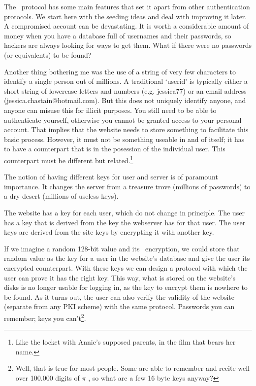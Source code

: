 The \TIMO\ protocol has some main features that set it apart from other authentication protocols.
We start here with the seeding ideas and deal with improving it later.
A compromised account can be devastating.
It is worth a considerable amount of money when you have a database full of usernames and their passwords, so hackers are always looking for ways to get them.
What if there were no passwords (or equivalents) to be found?
\par
Another thing bothering me was the use of a string of very few characters to identify a single person out of millions.
A traditional `userid' is typically either a short string of lowercase letters and numbers
(e.g. jessica77)
or an email address
(jessica.chastain@hotmail.com).
But this does not uniquely identify anyone, and anyone can misuse this for illicit purposes.
You still need to be able to authenticate yourself, otherwise you cannot be granted access to your personal account.
That implies that the website needs to store something to facilitate this basic process.
However, it must not be something useable in and of itself; it has to have a counterpart that is in the posession of the individual user.
This counterpart must be different but related.\footnote{Like the locket with Annie's supposed parents, in the film that bears her name.}
\par
The notion of having different keys for user and server is of paramount importance.
It changes the server from a treasure trove (millions of passwords) to a dry desert (millions of useless keys).
\par
The website has a key for each user, which do not change in principle.
The user has a key that is derived from the key the webserver has for that user.
The user keys are derived from the site keys by encrypting it with another key.
\par
If we imagine a random 128-bit value and its \AES\ encryption, we could store that random value as the key for a user in the website's database and give the user its encrypted counterpart.
With these keys we can design a protocol with which the user can prove it has the right key.
This way, what is stored on the website's disks is no longer usable for logging in, as the key to encrypt them is nowhere to be found.
As it turns out, the user can also verify the validity of the website (separate from any PKI scheme) with the same protocol.
Passwords you can remember; keys you can't\footnote{Well, that is true for most people. Some are able to remember and recite well over 100.000 digits of \(\pi\) \cite{pi-world-ranking-list}, so what are a few 16 byte keys anyway?}.
